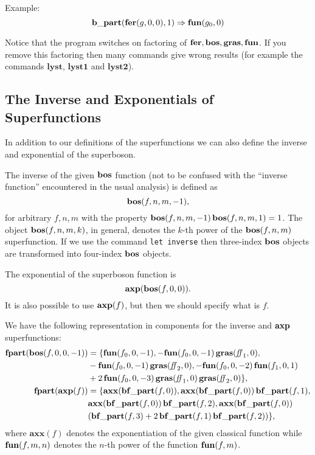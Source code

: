 {\begin{enumerate}
  Example:
  \begin{equation*}
    \mathbf{b\_part}(\mathbf{fer}(g,0,0),1) \Rightarrow \mathbf{fun}(g_{0},0)
  \end{equation*}
\end{enumerate}

Notice that the program switches on factoring of
$\mathbf{fer},\mathbf{bos},\mathbf{gras},\mathbf{fun}$.  If you remove this factoring then many
commands give wrong results (for example the commands $\mathbf{lyst}$,
$\mathbf{lyst1}$ and $\mathbf{lyst2}$).

\subsection{The Inverse and Exponentials of Superfunctions}

In addition to our definitions of the superfunctions we can also
define the inverse and exponential of the superboson.

The inverse of the given $\mathbf{bos}$ function (not to be confused with the
``inverse function'' encountered in the usual analysis) is defined as
\begin{equation*}
  \mathbf{bos}(f,n,m,-1),
\end{equation*}
for arbitrary $f,n,m$ with the property
$\mathbf{bos}(f,n,m,-1)\,\mathbf{bos}(f,n,m,1)=1$.  The object $\mathbf{bos}(f,n,m,k)$, in
general, denotes the $k$-th power of the $\mathbf{bos}(f,n,m)$ superfunction.
If we use the command \texttt{let inverse} then three-index $\mathbf{bos}$
objects are transformed into four-index $\mathbf{bos}$ objects.

The exponential of the superboson function is
\begin{equation*}
  \mathbf{axp}(\mathbf{bos}(f,0,0)).
\end{equation*}
It is also possible to use $\mathbf{axp}(f)$, but then we should specify what
is $f$.

We have the following representation in components for the inverse and
$\mathbf{axp}$ superfunctions:
\begin{align*}
  \mathbf{fpart}(\mathbf{bos}(f,0,0,-1)) & = \{ \mathbf{fun}(f_{0},0,-1), -\mathbf{fun}(f_{0},0,-1)\,\mathbf{gras}(\mathit{ff}_{1},0), \\
  & -\mathbf{fun}(f_{0},0,-1)\,\mathbf{gras}(\mathit{ff}_{2},0), - \mathbf{fun}(f_{0},0,-2)\,\mathbf{fun}(f_{1},0,1) \\
  & + 2\,\mathbf{fun}(f_{0},0,-3)\,\mathbf{gras}(\mathit{ff}_{1},0)\,\mathbf{gras}(\mathit{ff}_{2},0) \}, \\
  \mathbf{fpart}(\mathbf{axp}(f)) & = \{ \mathbf{axx}(\mathbf{bf\_part}(f,0)),
  \mathbf{axx}(\mathbf{bf\_part}(f,0))\,\mathbf{bf\_part}(f,1), \\
  & \mathbf{axx}(\mathbf{bf\_part}(f,0))\,\mathbf{bf\_part}(f,2), \mathbf{axx}(\mathbf{bf\_part}(f,0)) \\
  & (\mathbf{bf\_part}(f,3)+2\,\mathbf{bf\_part}(f,1)\,\mathbf{bf\_part}(f,2)) \},
\end{align*}
where $\mathbf{axx}(f)$ denotes the exponentiation of the given
classical function while $\mathbf{fun}(f,m,n)$ denotes the $n$-th power of the
function $\mathbf{fun}(f,m)$.

}

